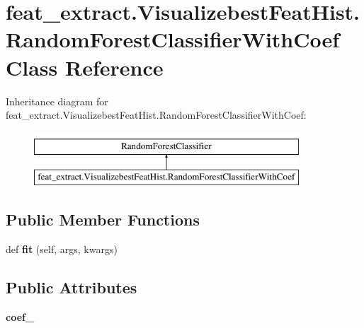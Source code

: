 \hypertarget{classfeat__extract_1_1_visualizebest_feat_hist_1_1_random_forest_classifier_with_coef}{}\section{feat\+\_\+extract.\+Visualizebest\+Feat\+Hist.\+Random\+Forest\+Classifier\+With\+Coef Class Reference}
\label{classfeat__extract_1_1_visualizebest_feat_hist_1_1_random_forest_classifier_with_coef}
Inheritance diagram for feat\+\_\+extract.\+Visualizebest\+Feat\+Hist.\+Random\+Forest\+Classifier\+With\+Coef\+:\begin{figure}[H]
\begin{center}
\leavevmode
\includegraphics[height=2.000000cm]{classfeat__extract_1_1_visualizebest_feat_hist_1_1_random_forest_classifier_with_coef}
\end{center}
\end{figure}
\subsection*{Public Member Functions}
\begin{DoxyCompactItemize}
\item 
\hypertarget{classfeat__extract_1_1_visualizebest_feat_hist_1_1_random_forest_classifier_with_coef_a0ac6362a2de826c2edc97e865aebce38}{}def {\bfseries fit} (self, args, kwargs)\label{classfeat__extract_1_1_visualizebest_feat_hist_1_1_random_forest_classifier_with_coef_a0ac6362a2de826c2edc97e865aebce38}

\end{DoxyCompactItemize}
\subsection*{Public Attributes}
\begin{DoxyCompactItemize}
\item 
\hypertarget{classfeat__extract_1_1_visualizebest_feat_hist_1_1_random_forest_classifier_with_coef_aae42401debd4804c8425fa2fe9594fec}{}{\bfseries coef\+\_\+}\label{classfeat__extract_1_1_visualizebest_feat_hist_1_1_random_forest_classifier_with_coef_aae42401debd4804c8425fa2fe9594fec}

\end{DoxyCompactItemize}


